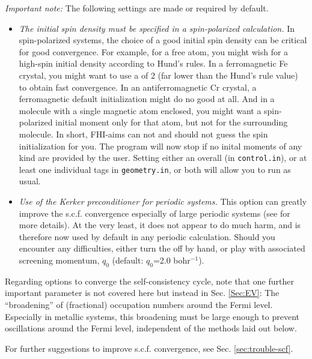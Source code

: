 \emph{Important note:} The following settings are made or required by
default. 
\begin{itemize}
  \item \emph{The initial spin density must be specified in a spin-polarized
    calculation.} In spin-polarized systems, the choice of a good initial
    spin density can be critical for good convergence. For example, for a free
    atom, you might wish for a high-spin initial density according to Hund's
    rules. In a ferromagnetic Fe crystal, you might want to use a
     of 2 (far lower than the Hund's rule
    value) to obtain fast convergence. In an antiferromagnetic Cr crystal, a
    ferromagnetic default initialization might do no good at all. And in a
    molecule with a single magnetic atom enclosed, you might want a
    spin-polarized initial moment only for that atom, but not for the
    surrounding molecule. In short, FHI-aims can not and should not guess the
    spin initialization for you. The program will now stop if no inital
    moments of any kind are provided by the user. Setting either an overall
     (in \texttt{control.in}), or at least
    one individual  tags in \texttt{geometry.in}, or
    both will allow you to run as usual.
  \item \emph{Use of the Kerker preconditioner for periodic systems.} This
    option can greatly improve the s.c.f. convergence especially of large
    periodic systems (see  for more details). At the
    very least, it does not appear to do much harm, and is therefore now used
    by default in any periodic calculation. Should you encounter any
    difficulties, either turn the  off by hand, or
    play with associated screening momentum, $q_0$ (default: $q_0$=2.0
    bohr$^{-1}$). 
\end{itemize}

Regarding options to converge the self-consistency cycle, note that
one further important parameter is not covered here but instead in
Sec. \ref{Sec:EV}: The ``broadening'' of (fractional) occupation numbers
around the Fermi level. Especially in metallic systems, this
broadening must be large enough to prevent oscillations around the
Fermi level, independent of the methods laid out below.

For further suggestions to improve s.c.f. convergence, see Sec. \ref{sec:trouble-scf}. 


\newpage

